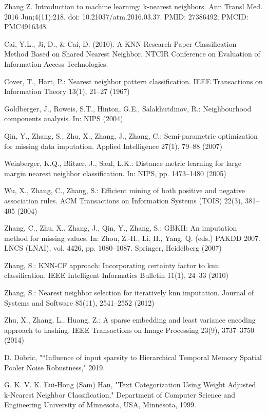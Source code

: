 \documentclass[conference]{IEEEtran}
\begin{document}
\begin{thebibliography}{1}
Zhang Z. Introduction to machine learning: k-nearest neighbors. Ann Transl Med. 2016 Jun;4(11):218. doi: 10.21037/atm.2016.03.37. PMID: 27386492; PMCID: PMC4916348.

Cai, Y.L., Ji, D., \& Cai, D. (2010). A KNN Research Paper Classification Method Based on Shared Nearest Neighbor. NTCIR Conference on Evaluation of Information Access Technologies.

Cover, T., Hart, P.: Nearest neighbor pattern classification. IEEE Transactions on Information Theory 13(1), 21–27 (1967)

Goldberger, J., Roweis, S.T., Hinton, G.E., Salakhutdinov, R.: Neighbourhood components analysis. In: NIPS (2004)

Qin, Y., Zhang, S., Zhu, X., Zhang, J., Zhang, C.: Semi-parametric optimization for missing data imputation. Applied Intelligence 27(1), 79–88 (2007)

Weinberger, K.Q., Blitzer, J., Saul, L.K.: Distance metric learning for large margin nearest neighbor classification. In: NIPS, pp. 1473–1480 (2005)

Wu, X., Zhang, C., Zhang, S.: Efficient mining of both positive and negative association rules. ACM Transactions on Information Systems (TOIS) 22(3), 381–405 (2004)

Zhang, C., Zhu, X., Zhang, J., Qin, Y., Zhang, S.: GBKII: An imputation method for missing values. In: Zhou, Z.-H., Li, H., Yang, Q. (eds.) PAKDD 2007. LNCS (LNAI), vol. 4426, pp. 1080–1087. Springer, Heidelberg (2007)

Zhang, S.: KNN-CF approach: Incorporating certainty factor to knn classification. IEEE Intelligent Informatics Bulletin 11(1), 24–33 (2010)

Zhang, S.: Nearest neighbor selection for iteratively knn imputation. Journal of Systems and Software 85(11), 2541–2552 (2012)

Zhu, X., Zhang, L., Huang, Z.: A sparse embedding and least variance encoding approach to hashing. IEEE Transactions on Image Processing 23(9), 3737–3750 (2014)

D. Dobric, "“Influence of input sparsity to Hierarchical Temporal Memory Spatial Pooler Noise Robustness," 2019.

G. K. V. K. Eui-Hong (Sam) Han, "Text Categorization Using Weight Adjusted k-Nearest Neighbor Classification," Department of Computer Science and Engineering University of Minnesota, USA, Minnesota, 1999.


\end{thebibliography}
\end{document}
